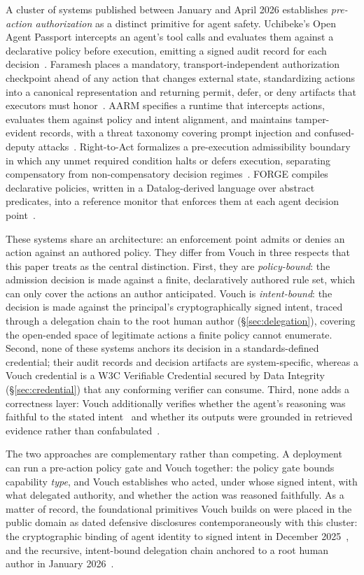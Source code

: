 \documentclass[11pt,a4paper]{article}
\begin{document}
A cluster of systems published between January and April 2026 establishes \emph{pre-action authorization} as a distinct primitive for agent safety. Uchibeke's Open Agent Passport intercepts an agent's tool calls and evaluates them against a declarative policy before execution, emitting a signed audit record for each decision~\cite{oap2026}. Faramesh places a mandatory, transport-independent authorization checkpoint ahead of any action that changes external state, standardizing actions into a canonical representation and returning permit, defer, or deny artifacts that executors must honor~\cite{faramesh2026}. AARM specifies a runtime that intercepts actions, evaluates them against policy and intent alignment, and maintains tamper-evident records, with a threat taxonomy covering prompt injection and confused-deputy attacks~\cite{aarm2026}. Right-to-Act formalizes a pre-execution admissibility boundary in which any unmet required condition halts or defers execution, separating compensatory from non-compensatory decision regimes~\cite{righttoact2026}. FORGE compiles declarative policies, written in a Datalog-derived language over abstract predicates, into a reference monitor that enforces them at each agent decision point~\cite{forge2026}.

These systems share an architecture: an enforcement point admits or denies an action against an authored policy. They differ from Vouch in three respects that this paper treats as the central distinction. First, they are \emph{policy-bound}: the admission decision is made against a finite, declaratively authored rule set, which can only cover the actions an author anticipated. Vouch is \emph{intent-bound}: the decision is made against the principal's cryptographically signed intent, traced through a delegation chain to the root human author (\S\ref{sec:delegation}), covering the open-ended space of legitimate actions a finite policy cannot enumerate. Second, none of these systems anchors its decision in a standards-defined credential; their audit records and decision artifacts are system-specific, whereas a Vouch credential is a W3C Verifiable Credential secured by Data Integrity (\S\ref{sec:credential}) that any conforming verifier can consume. Third, none adds a correctness layer: Vouch additionally verifies whether the agent's reasoning was faithful to the stated intent~\cite{pad017} and whether its outputs were grounded in retrieved evidence rather than confabulated~\cite{pad045}.

The two approaches are complementary rather than competing. A deployment can run a pre-action policy gate and Vouch together: the policy gate bounds capability \emph{type}, and Vouch establishes who acted, under whose signed intent, with what delegated authority, and whether the action was reasoned faithfully. As a matter of record, the foundational primitives Vouch builds on were placed in the public domain as dated defensive disclosures contemporaneously with this cluster: the cryptographic binding of agent identity to signed intent in December 2025~\cite{pad001}, and the recursive, intent-bound delegation chain anchored to a root human author in January 2026~\cite{pad002}.
\end{document}

